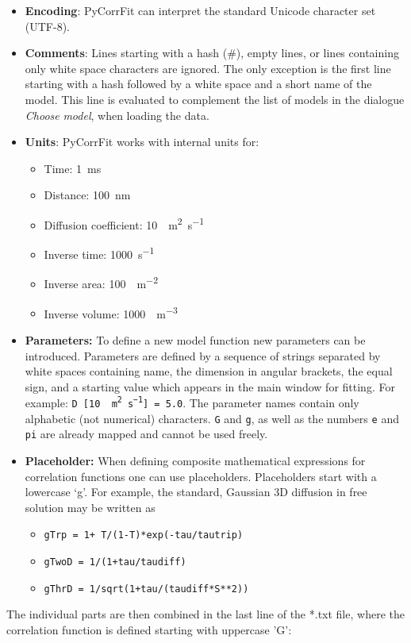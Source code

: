\begin{itemize}
\item \textbf{Encoding}: PyCorrFit can interpret the standard Unicode character set (UTF-8).
\item \textbf{Comments}: Lines starting with a hash (\#), empty lines, or lines containing only white space characters are ignored. The only exception is the first line starting with a hash followed by a white space and a short name of the model. This line is evaluated to complement the list of models in the dialogue\textit{ Choose }\textit{model}, when loading the data.
\item \textbf{Units}: PyCorrFit works with internal units for:

\begin{itemize}
\item Time: \SI{1}{ms}
\item Distance: \SI{100}{nm}
\item Diffusion coefficient: \SI{10}{\mu m^2s^{-1}} 
\item Inverse time: \SI{1000}{s^{-1}} 
\item Inverse area: \SI{100}{\mu m^{-2}} 
\item Inverse volume: \SI{1000}{\mu m^{-3}} 
\end{itemize}
\item \textbf{Parameters:} To define a new model function new parameters can be introduced. Parameters are defined by a sequence of strings separated by white spaces containing name, the dimension in angular brackets, the equal sign, and a starting value which appears in the main window for fitting. For example: \texttt{D [\SI{10}{\mu m^ 2 s^{-1}}] = 5.0}.
 The parameter names contain only alphabetic (not numerical) characters. \texttt{G} and \texttt{g}, as well as the numbers \texttt{e} and \texttt{pi} are already mapped and cannot be used freely.
\item \textbf{Placeholder:} When defining composite mathematical expressions for correlation functions one can use placeholders. Placeholders start with a lowercase ‘g’. For example, the standard, Gaussian 3D diffusion in free solution may be written as

\begin{itemize}
\item \texttt{gTrp = 1+ T/(1-T)*exp(-tau/tautrip)}
\item \texttt{gTwoD = 1/(1+tau/taudiff)}
\item \texttt{gThrD = 1/sqrt(1+tau/(taudiff*S**2))}
\end{itemize}
\end{itemize}
The individual parts are then combined in the last line of the *.txt file, where the correlation function is defined starting with uppercase ’G’:

